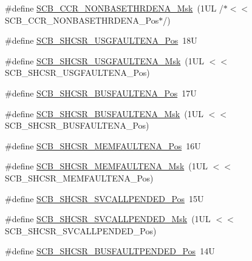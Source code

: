 \begin{DoxyCompactItemize}
\item 
\#define \hyperlink{group___c_m_s_i_s___s_c_b_gafe0f6be81b35d72d0736a0a1e3b4fbb3}{S\-C\-B\-\_\-\-C\-C\-R\-\_\-\-N\-O\-N\-B\-A\-S\-E\-T\-H\-R\-D\-E\-N\-A\-\_\-\-Msk}~(1\-U\-L /$\ast$$<$$<$ S\-C\-B\-\_\-\-C\-C\-R\-\_\-\-N\-O\-N\-B\-A\-S\-E\-T\-H\-R\-D\-E\-N\-A\-\_\-\-Pos$\ast$/)
\item 
\#define \hyperlink{group___c_m_s_i_s___s_c_b_gae71949507636fda388ec11d5c2d30b52}{S\-C\-B\-\_\-\-S\-H\-C\-S\-R\-\_\-\-U\-S\-G\-F\-A\-U\-L\-T\-E\-N\-A\-\_\-\-Pos}~18\-U
\item 
\#define \hyperlink{group___c_m_s_i_s___s_c_b_ga056fb6be590857bbc029bed48b21dd79}{S\-C\-B\-\_\-\-S\-H\-C\-S\-R\-\_\-\-U\-S\-G\-F\-A\-U\-L\-T\-E\-N\-A\-\_\-\-Msk}~(1\-U\-L $<$$<$ S\-C\-B\-\_\-\-S\-H\-C\-S\-R\-\_\-\-U\-S\-G\-F\-A\-U\-L\-T\-E\-N\-A\-\_\-\-Pos)
\item 
\#define \hyperlink{group___c_m_s_i_s___s_c_b_ga3d32edbe4a5c0335f808cfc19ec7e844}{S\-C\-B\-\_\-\-S\-H\-C\-S\-R\-\_\-\-B\-U\-S\-F\-A\-U\-L\-T\-E\-N\-A\-\_\-\-Pos}~17\-U
\item 
\#define \hyperlink{group___c_m_s_i_s___s_c_b_ga43e8cbe619c9980e0d1aacc85d9b9e47}{S\-C\-B\-\_\-\-S\-H\-C\-S\-R\-\_\-\-B\-U\-S\-F\-A\-U\-L\-T\-E\-N\-A\-\_\-\-Msk}~(1\-U\-L $<$$<$ S\-C\-B\-\_\-\-S\-H\-C\-S\-R\-\_\-\-B\-U\-S\-F\-A\-U\-L\-T\-E\-N\-A\-\_\-\-Pos)
\item 
\#define \hyperlink{group___c_m_s_i_s___s_c_b_ga685b4564a8760b4506f14ec4307b7251}{S\-C\-B\-\_\-\-S\-H\-C\-S\-R\-\_\-\-M\-E\-M\-F\-A\-U\-L\-T\-E\-N\-A\-\_\-\-Pos}~16\-U
\item 
\#define \hyperlink{group___c_m_s_i_s___s_c_b_gaf084424fa1f69bea36a1c44899d83d17}{S\-C\-B\-\_\-\-S\-H\-C\-S\-R\-\_\-\-M\-E\-M\-F\-A\-U\-L\-T\-E\-N\-A\-\_\-\-Msk}~(1\-U\-L $<$$<$ S\-C\-B\-\_\-\-S\-H\-C\-S\-R\-\_\-\-M\-E\-M\-F\-A\-U\-L\-T\-E\-N\-A\-\_\-\-Pos)
\item 
\#define \hyperlink{group___c_m_s_i_s___s_c_b_ga2f93ec9b243f94cdd3e94b8f0bf43641}{S\-C\-B\-\_\-\-S\-H\-C\-S\-R\-\_\-\-S\-V\-C\-A\-L\-L\-P\-E\-N\-D\-E\-D\-\_\-\-Pos}~15\-U
\item 
\#define \hyperlink{group___c_m_s_i_s___s_c_b_ga6095a7acfbad66f52822b1392be88652}{S\-C\-B\-\_\-\-S\-H\-C\-S\-R\-\_\-\-S\-V\-C\-A\-L\-L\-P\-E\-N\-D\-E\-D\-\_\-\-Msk}~(1\-U\-L $<$$<$ S\-C\-B\-\_\-\-S\-H\-C\-S\-R\-\_\-\-S\-V\-C\-A\-L\-L\-P\-E\-N\-D\-E\-D\-\_\-\-Pos)
\item 
\#define \hyperlink{group___c_m_s_i_s___s_c_b_gaa22551e24a72b65f1e817f7ab462203b}{S\-C\-B\-\_\-\-S\-H\-C\-S\-R\-\_\-\-B\-U\-S\-F\-A\-U\-L\-T\-P\-E\-N\-D\-E\-D\-\_\-\-Pos}~14\-U

\end{DoxyCompactItemize}
